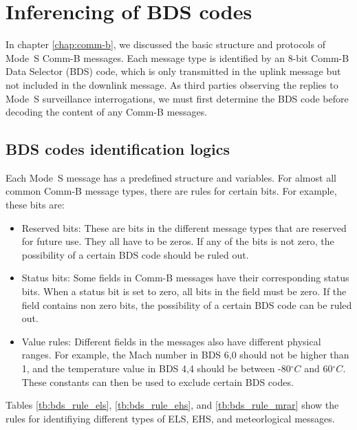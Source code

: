 \chapter{Inferencing of BDS codes} \label{chap:bds_infer}

In chapter \ref{chap:comm-b}, we discussed the basic structure and protocols of Mode~S Comm-B messages. Each message type is identified by an 8-bit Comm-B Data Selector (BDS) code, which is only transmitted in the uplink message but not included in the downlink message. As third parties observing the replies to Mode~S surveillance interrogations, we must first determine the BDS code before decoding the content of any Comm-B messages. 


\section{BDS codes identification logics}

Each Mode~S message has a predefined structure and variables. For almost all common Comm-B message types, there are rules for certain bits. For example, these bits are:
\begin{itemize}
    \item Reserved bits: These are bits in the different message types that are reserved for future use. They all have to be zeros. If any of the bits is not zero, the possibility of a certain BDS code should be ruled out.
    \item Status bits: Some fields in Comm-B messages have their corresponding status bits. When a status bit is set to zero, all bits in the field must be zero. If the field contains non zero bits, the possibility of a certain BDS code can be ruled out.
    \item Value rules: Different fields in the messages also have different physical ranges. For example, the Mach number in BDS 6,0 should not be higher than 1, and the temperature value in BDS 4,4 should be between -80$^\circ C$ and 60$^\circ C$. These constants can then be used to exclude certain BDS codes.
\end{itemize}


Tables \ref{tb:bds_rule_els}, \ref{tb:bds_rule_ehs}, and \ref{tb:bds_rule_mrar} show the rules for identifiying different types of ELS, EHS, and meteorlogical messages.


